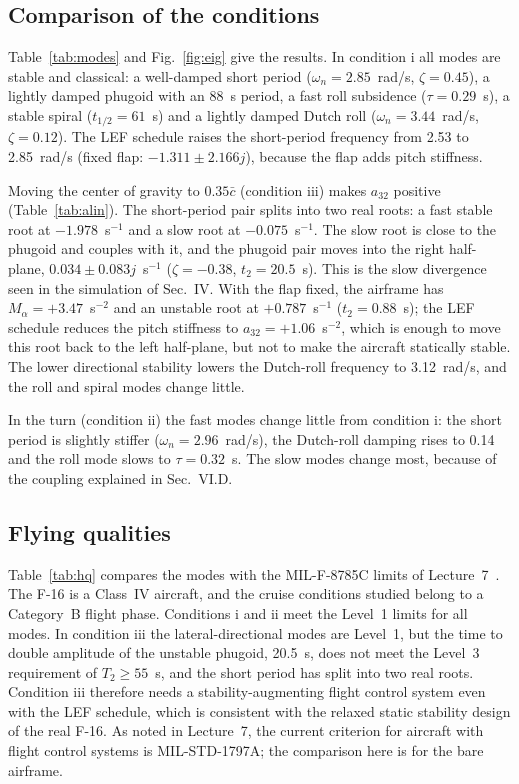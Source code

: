 \documentclass[conf]{new-aiaa}
\begin{document}
\subsection{Comparison of the conditions}
Table~\ref{tab:modes} and Fig.~\ref{fig:eig} give the results. In condition i all modes are stable and classical: a well-damped short period ($\omega_n=2.85$~rad/s, $\zeta=0.45$), a lightly damped phugoid with an 88~s period, a fast roll subsidence ($\tau=0.29$~s), a stable spiral ($t_{1/2}=61$~s) and a lightly damped Dutch roll ($\omega_n=3.44$~rad/s, $\zeta=0.12$). The LEF schedule raises the short-period frequency from 2.53 to 2.85~rad/s (fixed flap: $-1.311\pm2.166j$), because the flap adds pitch stiffness.

Moving the center of gravity to $0.35\bar c$ (condition iii) makes $a_{32}$ positive (Table~\ref{tab:alin}). The short-period pair splits into two real roots: a fast stable root at $-1.978$~s$^{-1}$ and a slow root at $-0.075$~s$^{-1}$. The slow root is close to the phugoid and couples with it, and the phugoid pair moves into the right half-plane, $0.034\pm0.083j$~s$^{-1}$ ($\zeta=-0.38$, $t_2=20.5$~s). This is the slow divergence seen in the simulation of Sec.~IV. With the flap fixed, the airframe has $M_\alpha=+3.47$~s$^{-2}$ and an unstable root at $+0.787$~s$^{-1}$ ($t_2=0.88$~s); the LEF schedule reduces the pitch stiffness to $a_{32}=+1.06$~s$^{-2}$, which is enough to move this root back to the left half-plane, but not to make the aircraft statically stable. The lower directional stability lowers the Dutch-roll frequency to 3.12~rad/s, and the roll and spiral modes change little.

In the turn (condition ii) the fast modes change little from condition i: the short period is slightly stiffer ($\omega_n=2.96$~rad/s), the Dutch-roll damping rises to 0.14 and the roll mode slows to $\tau=0.32$~s. The slow modes change most, because of the coupling explained in Sec.~VI.D.

\subsection{Flying qualities}
Table~\ref{tab:hq} compares the modes with the MIL-F-8785C limits of Lecture~7~\cite{lec7}. The F-16 is a Class~IV aircraft, and the cruise conditions studied belong to a Category~B flight phase. Conditions i and ii meet the Level~1 limits for all modes. In condition iii the lateral-directional modes are Level~1, but the time to double amplitude of the unstable phugoid, 20.5~s, does not meet the Level~3 requirement of $T_2\ge55$~s, and the short period has split into two real roots. Condition iii therefore needs a stability-augmenting flight control system even with the LEF schedule, which is consistent with the relaxed static stability design of the real F-16. As noted in Lecture~7, the current criterion for aircraft with flight control systems is MIL-STD-1797A; the comparison here is for the bare airframe.
\end{document}
